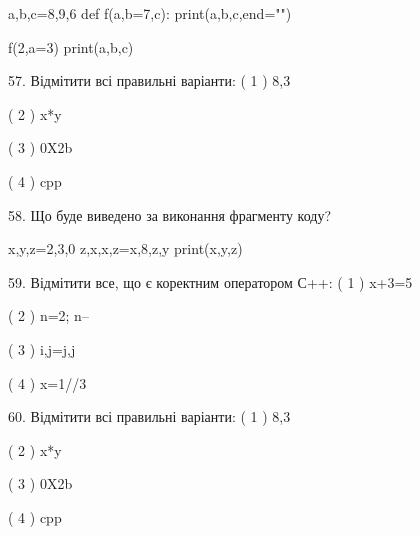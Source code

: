 \documentclass[11pt]{article}
\begin{document}
a,b,c=8,9,6
def f(a,b=7,c):
    print(a,b,c,end="")

f(2,a=3)
print(a,b,c)


57. Відмітити всі правильні варіанти:
( 1 ) 8,3

( 2 ) x*y

( 3 ) 0X2b

( 4 ) cpp

58. Що буде виведено за виконання фрагменту коду?

x,y,z=2,3,0
z,x,x,z=x,8,z,y
print(x,y,z)

59. Відмітити все, що є коректним оператором С++:
( 1 ) x+3=5

( 2 ) n=2; n--

( 3 ) i,j=j,j

( 4 ) x=1//3

60. Відмітити всі правильні варіанти:
( 1 ) 8,3

( 2 ) x*y

( 3 ) 0X2b

( 4 ) cpp





























































\newpage
\end{document}
